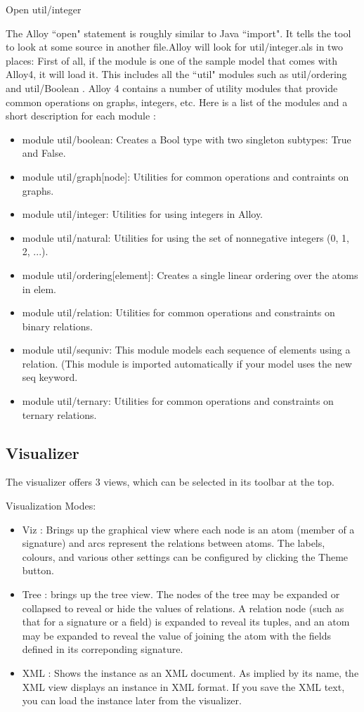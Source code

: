 \documentclass[a4paper,12pt]{report}
\begin{document}
Open util/integer

The Alloy ``open" statement is roughly similar to Java ``import". It tells the tool to look at some source in another file.Alloy will look for util/integer.als in two places: First of all, if the module is one of the sample model that comes with Alloy4, it will load it. This includes all the ``util" modules such as util/ordering and util/Boolean \cite{DanielJackson2004}.
Alloy 4 contains a number of utility modules that provide common operations on graphs, integers, etc. Here is a list of the modules and a short description for each module \cite{DanielJackson2004}:
\begin{itemize}
\item module util/boolean: Creates a Bool type with two singleton subtypes: True and False. 
\item module util/graph[node]: Utilities for common operations and contraints on graphs. 
\item module util/integer: Utilities for using integers in Alloy. 
\item module util/natural: Utilities for using the set of nonnegative integers (0, 1, 2, ...). 
\item module util/ordering[element]: Creates a single linear ordering over the atoms in elem. 
\item module util/relation: Utilities for common operations and constraints on binary relations. 
\item module util/sequniv: This module models each sequence of elements using a relation.
(This module is imported automatically if your model uses the new seq keyword. 
\item module util/ternary: Utilities for common operations and constraints on ternary relations.
\end{itemize}

\subsection{Visualizer} 
\label{visualiser}

The visualizer offers 3 views, which can be selected in its toolbar at the top.

Visualization Modes:
\begin{itemize}
\item Viz : Brings up the graphical view where each node is an atom (member of a signature) and arcs represent the relations between atoms. 
The labels, colours, and various other settings can be configured by clicking the Theme button. 
\item Tree : brings up the tree view. The nodes of the tree may be expanded or collapsed to reveal or hide the values of relations. A relation node (such as that for a signature or a field) is expanded to reveal its tuples, and an atom may be expanded to reveal the value of joining the atom with the fields defined in its correponding signature. 
\item XML : Shows the instance as an XML document. As implied by its name, the XML view displays an instance in XML format. If you save the XML text, you can load the instance later from the visualizer.
\end{itemize}  
\end{document}
